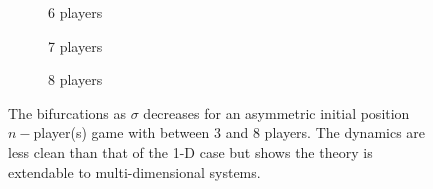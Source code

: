 \documentclass{article}
\begin{document}
\begin{figure}[ht!]
                    
                    \begin{subfigure}[b]{0.3\linewidth}
                        \centering
                         
                        \caption{6 players }  
                        \label{fig7:e} 
                        \vspace{4ex}
                    \end{subfigure}
                    \begin{subfigure}[b]{0.3\linewidth}
                        \centering
                         
                        \caption{7 players} 
                        \label{fig7:f} 
                        \vspace{4ex}
                    \end{subfigure}
                    \begin{subfigure}[b]{0.3\linewidth}
                        \centering
                         
                        \caption{8 players } 
                        \label{fig7:g}
                        \vspace{4ex}
                    \end{subfigure} 
        
                    \begin{subfigure}[b]{0.75\linewidth}
                        \centering
                         
                        \label{fig7:colorbar}
                    \end{subfigure}
                    
                    \caption{The bifurcations as $\sigma$ decreases for an asymmetric initial position $n-$player(s) game with between 3 and 8 players. The dynamics are less clean than that of the 1-D case but shows the theory is extendable to multi-dimensional systems.}
                    \label{fig7} 
                \end{figure}
        
                
                \clearpage

    
\end{document}
